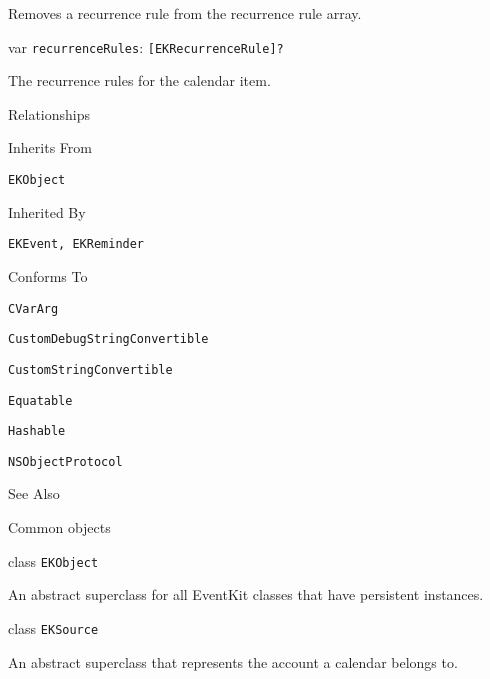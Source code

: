 \documentclass{article}
\begin{document}
Removes a recurrence rule from the recurrence rule array.

var \texttt{recurrenceRules}: \texttt{[EKRecurrenceRule]?}

The recurrence rules for the calendar item.

Relationships

Inherits From

\texttt{EKObject}

Inherited By

\texttt{EKEvent, EKReminder}

Conforms To

\texttt{CVarArg}

\texttt{CustomDebugStringConvertible}

\texttt{CustomStringConvertible}

\texttt{Equatable}

\texttt{Hashable}

\texttt{NSObjectProtocol}

See Also

Common objects

class \texttt{EKObject}

An abstract superclass for all EventKit classes that have persistent instances.

class \texttt{EKSource}

An abstract superclass that represents the account a calendar belongs to.

\newpage
\end{document}
